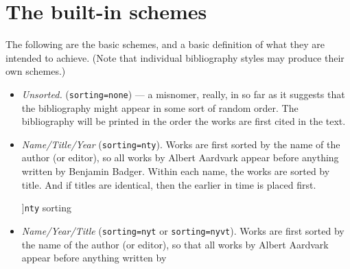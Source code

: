 \section{The built-in schemes}

The following are the basic schemes, and a
basic definition of what they are intended to achieve. (Note that
individual bibliography styles may produce their own schemes.)

\begin{itemize}
\item
  \emph{Unsorted.} (\texttt{sorting=none}) --- a misnomer, really, in so far as
  it suggests that the bibliography might appear in some sort of random
  order. The bibliography will be printed in the order the works are
  first cited in the text.
\item
  \emph{Name/Title/Year} (\texttt{sorting=nty}). Works are first sorted by the
  name of the author (or editor), so all works by Albert Aardvark appear
  before anything written by Benjamin Badger. Within each name, the
  works are sorted by title. And if titles are identical, then the
  earlier in time is placed first.
  \begin{marginfigure}[-20ex]
  \vspace{3pt}
  \caption[][]{\texttt{nty} sorting}
  \end{marginfigure}
\item \emph{Name/Year/Title} (\texttt{sorting=nyt} or \texttt{sorting=nyvt}).
  Works are first sorted by the name of the author (or editor), so
  that all works by Albert Aardvark appear before anything written by

\end{itemize}
